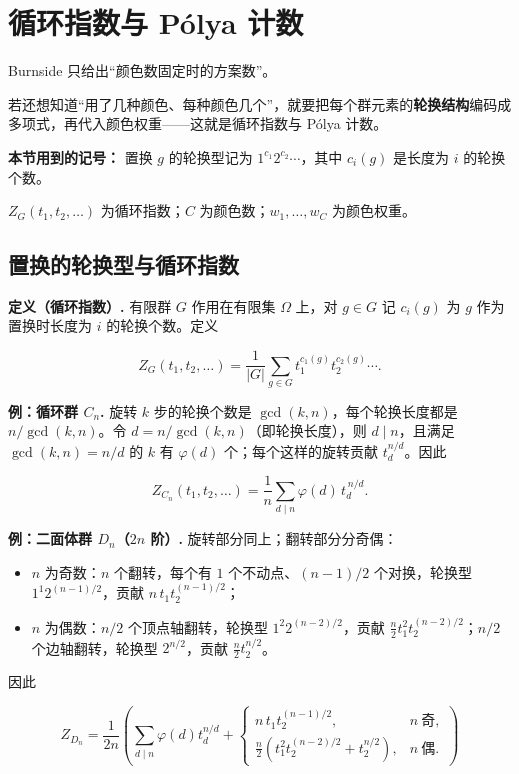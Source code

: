 \section{循环指数与 Pólya 计数}


Burnside 只给出“颜色数固定时的方案数”。

若还想知道“用了几种颜色、每种颜色几个”，就要把每个群元素的\textbf{轮换结构}编码成多项式，再代入颜色权重——这就是循环指数与 Pólya 计数。

\textbf{本节用到的记号：} 置换 $g$ 的轮换型记为 $1^{c_1}2^{c_2}\cdots$，其中 $c_i(g)$ 是长度为 $i$ 的轮换个数。

$Z_G(t_1,t_2,\dots)$ 为循环指数；$C$ 为颜色数；$w_1,\dots,w_C$ 为颜色权重。

\subsection{置换的轮换型与循环指数}


\textbf{定义（循环指数）.} 有限群 $G$ 作用在有限集 $\Omega$ 上，对 $g\in G$ 记 $c_i(g)$ 为 $g$ 作为置换时长度为 $i$ 的轮换个数。定义

\[
Z_G(t_1,t_2,\dots)=\frac{1}{|G|}\sum_{g\in G}
t_1^{c_1(g)}t_2^{c_2(g)}\cdots .
\]

\textbf{例：循环群 $C_n$.} 旋转 $k$ 步的轮换个数是 $\gcd(k,n)$，每个轮换长度都是 $n/\gcd(k,n)$。令 $d=n/\gcd(k,n)$（即轮换长度），则 $d\mid n$，且满足 $\gcd(k,n)=n/d$ 的 $k$ 有 $\varphi(d)$ 个；每个这样的旋转贡献 $t_d^{n/d}$。因此

\[
Z_{C_n}(t_1,t_2,\dots)=\frac{1}{n}\sum_{d\mid n}\varphi(d)\,t_d^{\,n/d}.
\]

\textbf{例：二面体群 $D_n$（$2n$ 阶）.} 旋转部分同上；翻转部分分奇偶：

\begin{itemize}
\item $n$ 为奇数：$n$ 个翻转，每个有 $1$ 个不动点、$(n-1)/2$ 个对换，轮换型 $1^1 2^{(n-1)/2}$，贡献 $n\,t_1t_2^{(n-1)/2}$；
\item $n$ 为偶数：$n/2$ 个顶点轴翻转，轮换型 $1^2 2^{(n-2)/2}$，贡献 $\frac n2 t_1^2t_2^{(n-2)/2}$；$n/2$ 个边轴翻转，轮换型 $2^{n/2}$，贡献 $\frac n2 t_2^{n/2}$。
\end{itemize}


因此

\[
Z_{D_n}=\frac{1}{2n}\left(\sum_{d\mid n}\varphi(d)t_d^{n/d}
+\begin{cases}
n\,t_1t_2^{(n-1)/2}, & n\ \text{奇},\\[2pt]
\frac n2\left(t_1^2t_2^{(n-2)/2}+t_2^{n/2}\right), & n\ \text{偶}.
\end{cases}\right)
\]

